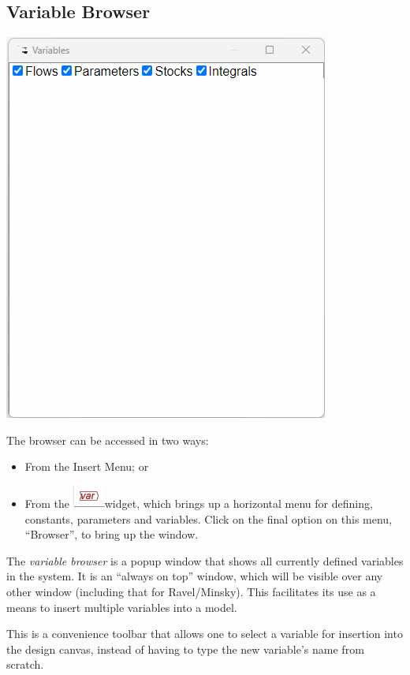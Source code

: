 \subsection{Variable Browser}

\label{VariableBrowser}

\includegraphics{images/browserWindow}

The browser can be accessed in two ways:
\begin{itemize}
\item From the Insert Menu; or 
\item From the \includegraphics{images/var}widget, which brings up a horizontal
menu for defining, constants, parameters and variables. Click on the
final option on this menu, ``Browser'', to bring up the window. 
\end{itemize}
The {\em variable browser} is a popup window that shows all currently
defined variables in the system. It is an ``always on top'' window,
which will be visible over any other window (including that for Ravel/Minsky).
This facilitates its use as a means to insert multiple variables into
a model.

This is a convenience toolbar that allows one to select a variable
for insertion into the design canvas, instead of having to type the
new variable's name from scratch.

